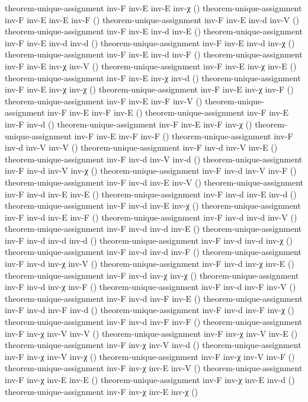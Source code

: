 \documentclass[11pt,a4paper]{article}
\begin{document}
\begin{code}
theorem-unique-assignment inv-F inv-E inv-E inv-χ ()
theorem-unique-assignment inv-F inv-E inv-E inv-F ()
theorem-unique-assignment inv-F inv-E inv-d inv-V ()
theorem-unique-assignment inv-F inv-E inv-d inv-E ()
theorem-unique-assignment inv-F inv-E inv-d inv-d ()
theorem-unique-assignment inv-F inv-E inv-d inv-χ ()
theorem-unique-assignment inv-F inv-E inv-d inv-F ()
theorem-unique-assignment inv-F inv-E inv-χ inv-V ()
theorem-unique-assignment inv-F inv-E inv-χ inv-E ()
theorem-unique-assignment inv-F inv-E inv-χ inv-d ()
theorem-unique-assignment inv-F inv-E inv-χ inv-χ ()
theorem-unique-assignment inv-F inv-E inv-χ inv-F ()
theorem-unique-assignment inv-F inv-E inv-F inv-V ()
theorem-unique-assignment inv-F inv-E inv-F inv-E ()
theorem-unique-assignment inv-F inv-E inv-F inv-d ()
theorem-unique-assignment inv-F inv-E inv-F inv-χ ()
theorem-unique-assignment inv-F inv-E inv-F inv-F ()
theorem-unique-assignment inv-F inv-d inv-V inv-V ()
theorem-unique-assignment inv-F inv-d inv-V inv-E ()
theorem-unique-assignment inv-F inv-d inv-V inv-d ()
theorem-unique-assignment inv-F inv-d inv-V inv-χ ()
theorem-unique-assignment inv-F inv-d inv-V inv-F ()
theorem-unique-assignment inv-F inv-d inv-E inv-V ()
theorem-unique-assignment inv-F inv-d inv-E inv-E ()
theorem-unique-assignment inv-F inv-d inv-E inv-d ()
theorem-unique-assignment inv-F inv-d inv-E inv-χ ()
theorem-unique-assignment inv-F inv-d inv-E inv-F ()
theorem-unique-assignment inv-F inv-d inv-d inv-V ()
theorem-unique-assignment inv-F inv-d inv-d inv-E ()
theorem-unique-assignment inv-F inv-d inv-d inv-d ()
theorem-unique-assignment inv-F inv-d inv-d inv-χ ()
theorem-unique-assignment inv-F inv-d inv-d inv-F ()
theorem-unique-assignment inv-F inv-d inv-χ inv-V ()
theorem-unique-assignment inv-F inv-d inv-χ inv-E ()
theorem-unique-assignment inv-F inv-d inv-χ inv-χ ()
theorem-unique-assignment inv-F inv-d inv-χ inv-F ()
theorem-unique-assignment inv-F inv-d inv-F inv-V ()
theorem-unique-assignment inv-F inv-d inv-F inv-E ()
theorem-unique-assignment inv-F inv-d inv-F inv-d ()
theorem-unique-assignment inv-F inv-d inv-F inv-χ ()
theorem-unique-assignment inv-F inv-d inv-F inv-F ()
theorem-unique-assignment inv-F inv-χ inv-V inv-V ()
theorem-unique-assignment inv-F inv-χ inv-V inv-E ()
theorem-unique-assignment inv-F inv-χ inv-V inv-d ()
theorem-unique-assignment inv-F inv-χ inv-V inv-χ ()
theorem-unique-assignment inv-F inv-χ inv-V inv-F ()
theorem-unique-assignment inv-F inv-χ inv-E inv-V ()
theorem-unique-assignment inv-F inv-χ inv-E inv-E ()
theorem-unique-assignment inv-F inv-χ inv-E inv-d ()
theorem-unique-assignment inv-F inv-χ inv-E inv-χ ()

\end{code}
\end{document}
